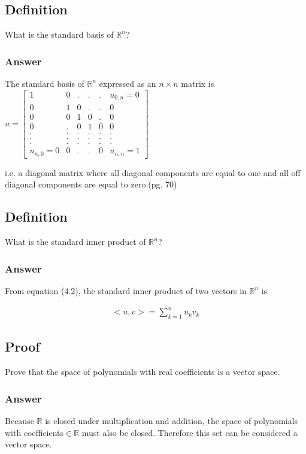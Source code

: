 \documentclass{article}
\begin{document}
		\subsection{Definition}
		What is the standard basis of $\mathbb{R}^{n}$?
		
		\subsubsection{Answer}
		The standard basis of $\mathbb{R}^{n}$ expressed as an $n\times n$ matrix is $u=\begin{bmatrix}
		1 & 0 & . & . & . & u_{0,n}=0\\
		0 & 1 & 0 & . & . & 0\\
		0 & 0 & 1 & 0 & . & 0\\
		0 & . & 0 & 1 & 0 & 0 \\
		. & . & . & . & . & . \\
		. & . & . & . & . & . \\
		. & . & . & . & . & . \\
		u_{n,0}=0 & 0 & . & . & 0 & u_{n,n}=1
		\end{bmatrix}$
		
		i.e. a diagonal matrix where all diagonal components are equal to one and all off diagonal components are equal to zero.\cite{BG}(pg. 70)
		\subsection{Definition}
		What is the standard inner product of $\mathbb{R}^{n}$?
		
		\subsubsection{Answer}
		From equation (4.2)\cite{BG}, the standard inner product of two vectors in $\mathbb{R}^{n}$ is 
		
		\begin{align*}
			<u,v>=\sum_{k=1}^{n}u_{k}v_{k}
		\end{align*}
		
		
		\subsection{Proof}
		Prove that the space of polynomials with real coefficients is a vector space.
		
		\subsubsection{Answer}
		Because $\mathbb{R}$ is closed under multiplication and addition, the space of polynomials with coefficients$\in\mathbb{R}$ must also be closed.  Therefore this set can be considered a vector space.
		
\end{document}
